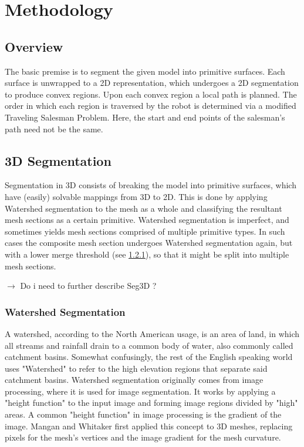 \chapter{Methodology}\label{methodology}

\section{Overview}
The basic premise is to segment the given model into primitive surfaces.
Each surface is unwrapped to a 2D representation, which undergoes a 2D segmentation to produce convex regions.
Upon each convex region a local path is planned.
The order in which each region is traversed by the robot is determined via a modified Traveling Salesman Problem.
Here, the start and end points of the salesman's path need not be the same.

\section{3D Segmentation}
Segmentation in 3D consists of breaking the model into primitive surfaces,
which have (easily) solvable mappings from 3D to 2D.
This is done by applying Watershed segmentation to the mesh as a whole and classifying the resultant mesh sections as a certain primitive.
Watershed segmentation is imperfect, and sometimes yields mesh sections comprised of multiple primitive types.
In such cases the composite mesh section undergoes Watershed segmentation again, but with a lower merge threshold (see \ref{ws_seg}), so that it might be split into multiple mesh sections.

$\rightarrow$ Do i need to further describe Seg3D ?

\subsection{Watershed Segmentation}\label{ws_seg}
A watershed, according to the North American usage, is an area of land, in which all streams and rainfall drain to a common body of water\cite{USGS_Watersheds}, also commonly called catchment basins.
Somewhat confusingly, the rest of the English speaking world uses "Watershed" to refer to the high elevation regions that separate said catchment basins.
Watershed segmentation originally comes from image processing, where it is used for image segmentation\cite{ImageSegWS, DigitalImageProc}.
It works by applying a "height function" to the input image and forming image regions divided by "high" areas.
A common "height function" in image processing is the gradient of the image\cite{ImageSegWS}.
Mangan and Whitaker first applied this concept to 3D meshes, replacing pixels for the mesh's vertices and the image gradient for the mesh curvature\cite{Watershed}.

